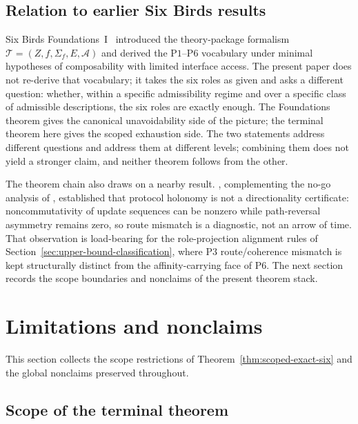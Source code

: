 \documentclass[11pt]{article}
\theoremstyle{definition}
\newcommand{\Pone}{\ensuremath{\mathrm{P1}}}
\newcommand{\Pthree}{\ensuremath{\mathrm{P3}}}
\newcommand{\Psix}{\ensuremath{\mathrm{P6}}}
\begin{document}
\subsection{Relation to earlier Six Birds results}\label{subsec:discussion-earlier-results}

Six Birds Foundations~I~\citep{Tsiokos2026SixBirdsFoundations}
introduced the theory-package formalism
\(\mathcal{T} = (Z, f, \Sigma_f, E, \mathcal{A})\) and derived the
\Pone{}--\Psix{} vocabulary under minimal hypotheses of composability
with limited interface access. The present paper does not re-derive
that vocabulary; it takes the six roles as given and asks a
different question: whether, within a specific admissibility regime
and over a specific class of admissible descriptions, the six roles
are exactly enough. The Foundations theorem gives the canonical
unavoidability side of the picture; the terminal theorem here gives
the scoped exhaustion side. The two statements address different
questions and address them at different levels; combining them does
not yield a stronger claim, and neither theorem follows from the
other.

The theorem chain also draws on a nearby
result. \citet{Tsiokos2026SixBirdsProtocolTrap}, complementing the
no-go analysis of \citet{Tsiokos2026SixBirdsNoGo}, established that
protocol holonomy is not a directionality certificate:
noncommutativity of update sequences can be nonzero while
path-reversal asymmetry remains zero, so route mismatch is a
diagnostic, not an arrow of time. That observation is load-bearing
for the role-projection alignment rules of
Section~\ref{sec:upper-bound-classification}, where \Pthree{}
route/coherence mismatch is kept structurally distinct from the
affinity-carrying face of \Psix{}. The next section records the
scope boundaries and nonclaims of the present theorem stack.
 \section{Limitations and nonclaims}\label{sec:limitations-nonclaims}



This section collects the scope restrictions of
Theorem~\ref{thm:scoped-exact-six} and the global nonclaims
preserved throughout.

\subsection{Scope of the terminal theorem}\label{subsec:terminal-scope}
\end{document}
